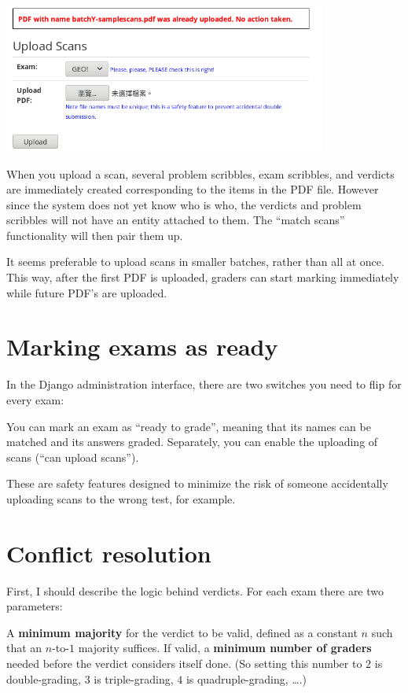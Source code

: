 \begin{center}
	\includegraphics[width=0.8\textwidth]{images/batchscan.png}
\end{center}

When you upload a scan,
several problem scribbles, exam scribbles, and verdicts
are immediately created corresponding to the items in the PDF file.
However since the system does not yet know who is who,
the verdicts and problem scribbles will not have an entity attached to them.
The ``match scans'' functionality will then pair them up.

It seems preferable to upload scans in smaller batches,
rather than all at once.
This way, after the first PDF is uploaded,
graders can start marking immediately
while future PDF's are uploaded.

\section{Marking exams as ready}
In the Django administration interface,
there are two switches you need to flip for every exam:
\begin{itemize}
	\ii You can mark an exam as ``ready to grade'',
	meaning that its names can be matched and its answers graded.
	\ii Separately, you can enable the uploading of scans
	(``can upload scans'').
\end{itemize}
These are safety features designed to minimize the risk
of someone accidentally uploading scans to the wrong test, for example.

\section{Conflict resolution}
First, I should describe the logic behind verdicts.
For each exam there are two parameters:
\begin{itemize}
	\ii A \textbf{minimum majority} for the verdict to be valid,
	defined as a constant $n$ such that an $n$-to-$1$ majority suffices.
	\ii If valid, a \textbf{minimum number of graders} needed before
	the verdict considers itself done.
	(So setting this number to $2$ is double-grading,
	$3$ is triple-grading, $4$ is quadruple-grading, \dots.)
\end{itemize}

